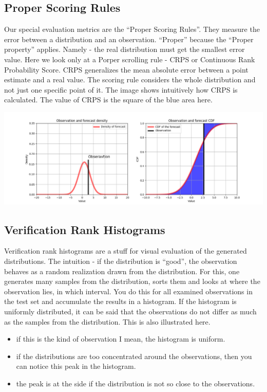 \documentclass[margin=0.01in]{article}
\begin{document}
\subsection{Proper Scoring Rules}
\label{sec:org3b9fb0d}
Our special evaluation metrics are the ``Proper Scoring Rules''. They measure the error between a distribution and an observation. ``Proper'' because the ``Proper property'' applies. Namely - the real distribution must get the smallest error value. Here we look only at a Porper scrolling rule - CRPS or Continuous Rank Probability Score. CRPS generalizes the mean absolute error between a point estimate and a real value. The scoring rule considers the whole distribution and not just one specific point of it. The image shows intuitively how CRPS is calculated. The value of CRPS is the square of the blue area here. 

\begin{center}
\includegraphics[width=.9\linewidth]{../images/crps.png}
\end{center}

\subsection{Verification Rank Histograms}
\label{sec:orgf4ef2fa}

Verification rank histograms are a stuff for visual evaluation of the generated distributions. The intuition - if the distribution is ``good'', the observation behaves as a random realization drawn from the distribution. For this, one generates many samples from the distribution, sorts them and looks at where the observation lies, in which interval. You do this for all examined observations in the test set and accumulate the results in a histogram. If the histogram is uniformly distributed, it can be said that the observations do not differ as much as the samples from the distribution. This is also illustrated here.
\begin{itemize}
\item if this is the kind of observation I mean, the histogram is uniform.
\item if the distributions are too concentrated around the observations, then you can notice this peak in the histogram.
\item the peak is at the side if the distribution is not so close to the observations.
\end{itemize}
\end{document}
